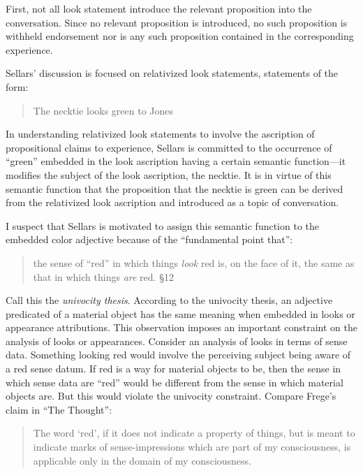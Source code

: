 \documentclass[12pt]{article}
\begin{document}
First, not all look statement introduce the relevant proposition into the conversation. Since no relevant proposition is introduced, no such proposition is withheld endorsement nor is any such proposition contained in the corresponding experience. 

Sellars' discussion is focused on relativized look statements, statements of the form:
\begin{quote}
    The necktie looks green to Jones
\end{quote}
In understanding relativized look statements to involve the ascription of propositional claims to experience, Sellars is committed to the occurrence of ``green'' embedded in the look ascription having a certain semantic function---it modifies the subject of the look ascription, the necktie. It is in virtue of this semantic function that the proposition that the necktie is green can be derived from the relativized look ascription and introduced as a topic of conversation. 

I suspect that Sellars is motivated to assign this semantic function to the embedded color adjective because of the ``fundamental point that'':
\begin{quote}
    the sense of ``red'' in which things \emph{look} red is, on the face of it, the same as that in which things \emph{are} red. §12
\end{quote} 
Call this the \emph{univocity thesis}. According to the univocity thesis, an adjective predicated of a material object has the same meaning when embedded in looks or appearance attributions. This observation imposes an important constraint on the analysis of looks or appearances. Consider an analysis of looks in terms of sense data. Something looking red would involve the perceiving subject being aware of a red sense datum. If red is a way for material objects to be, then the sense in which sense data are ``red'' would be different from the sense in which material objects are. But this would violate the univocity constraint. Compare Frege's claim in ``The Thought'': 
\begin{quote}
	The word `red', if it does not indicate a property of things, but is meant to indicate marks of sense-impressions which are part of my consciousness, is applicable only in the domain of my consciousness. \citet[67]{Frege:1918lq}
\end{quote}
\end{document}
